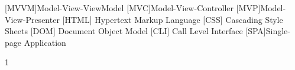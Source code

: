 






\begin{spacing}{1} %
	\frontmatter
	
	
	
	\tableofcontents
	\listoffigures
	\listoftables
	\newpage
	\begin{acronym}
	[MVVM]{Model-View-ViewModel}
	[MVC]{Model-View-Controller}
	[MVP]{Model-View-Presenter}
	 [HTML] {Hypertext Markup Language}
	 [CSS] {Cascading Style Sheets}
	 [DOM] {Document Object Model}
	 [CLI] {Call Level Interface}
	[SPA]{Single-page Application}
	\end{acronym}
\end{spacing}{1}
\mainmatter
{}










%


